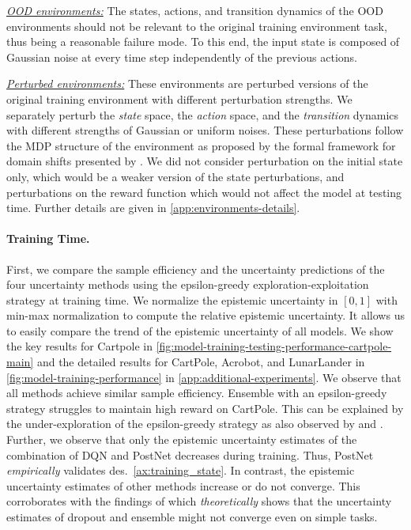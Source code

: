\textit{\underline{OOD environments:}} The states, actions, and transition dynamics of the OOD environments should not be relevant to the original training environment task, thus being a reasonable failure mode. To this end, the input state is composed of Gaussian noise at every time step independently of the previous actions. 

\textit{\underline{Perturbed environments:}} These environments are perturbed versions of the original training environment with different perturbation strengths. We separately perturb the \emph{state} space, the \emph{action} space, and the \emph{transition} dynamics with different strengths of Gaussian or uniform noises. These perturbations follow the MDP structure of the environment as proposed by the formal framework for domain shifts presented by \citet{domain-shifts-rl}. We did not consider perturbation on the initial state only, which would be a weaker version of the state perturbations, and perturbations on the reward function which would not affect the model at testing time. Further details are given in \cref{app:environments-details}.

\paragraph{Training Time.} First, we compare the sample efficiency and the uncertainty predictions of the four uncertainty methods using the epsilon-greedy exploration-exploitation strategy at training time. We normalize the epistemic uncertainty in $[0, 1]$ with min-max normalization to compute the relative epistemic uncertainty. It allows us to easily compare the trend of the epistemic uncertainty of all models. We show the key results for Cartpole in \cref{fig:model-training-testing-performance-cartpole-main} and the detailed results for CartPole, Acrobot, and LunarLander in \cref{fig:model-training-performance} in \cref{app:additional-experiments}. We observe that all methods achieve similar sample efficiency. Ensemble with an epsilon-greedy strategy struggles to maintain high reward on CartPole. This can be explained by the under-exploration of the epsilon-greedy strategy as also observed by \citet{randomized-prior-functions} and \citet{dropout}. Further, we observe that only the epistemic uncertainty estimates of the combination of DQN and PostNet decreases during training. Thus, PostNet \emph{empirically} validates des.~\ref{ax:training_state}. In contrast, the epistemic uncertainty estimates of other methods increase or do not converge. This corroborates with the findings of \cite{randomized-prior-functions} which \emph{theoretically} shows that the uncertainty estimates of dropout and ensemble might not converge even on simple tasks.

